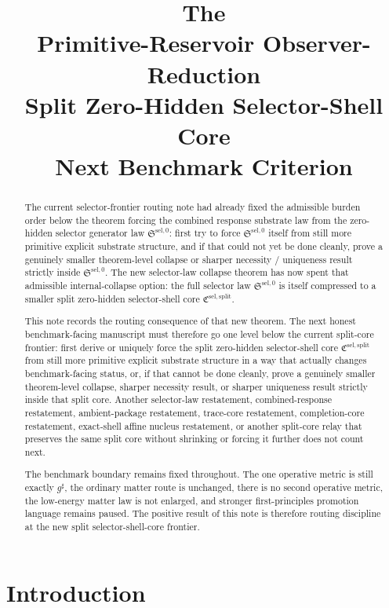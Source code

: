 \documentclass[11pt]{article}
\title{\textbf{The \TheoryName{}}\\[0.4em]
\large Primitive-Reservoir Observer-Reduction\\
\large Split Zero-Hidden Selector-Shell Core\\
\large Next Benchmark Criterion}
\author{}
\date{}
\newcommand{\CompletedMetric}{g^{\sharp}}
\newcommand{\SelectorLaw}{\mathfrak S^{\mathrm{sel},0}}
\newcommand{\SelectorCore}{\mathfrak C^{\mathrm{sel,split}}}
\begin{document}
\maketitle

\begin{abstract}
The current selector-frontier routing note had already fixed the admissible burden order below the theorem forcing the combined response substrate law from the zero-hidden selector generator law \(\SelectorLaw\): first try to force \(\SelectorLaw\) itself from still more primitive explicit substrate structure, and if that could not yet be done cleanly, prove a genuinely smaller theorem-level collapse or sharper necessity / uniqueness result strictly inside \(\SelectorLaw\). The new selector-law collapse theorem has now spent that admissible internal-collapse option: the full selector law \(\SelectorLaw\) is itself compressed to a smaller split zero-hidden selector-shell core \(\SelectorCore\).

This note records the routing consequence of that new theorem. The next honest benchmark-facing manuscript must therefore go one level below the current split-core frontier: first derive or uniquely force the split zero-hidden selector-shell core \(\SelectorCore\) from still more primitive explicit substrate structure in a way that actually changes benchmark-facing status, or, if that cannot be done cleanly, prove a genuinely smaller theorem-level collapse, sharper necessity result, or sharper uniqueness result strictly inside that split core. Another selector-law restatement, combined-response restatement, ambient-package restatement, trace-core restatement, completion-core restatement, exact-shell affine nucleus restatement, or another split-core relay that preserves the same split core without shrinking or forcing it further does not count next.

The benchmark boundary remains fixed throughout. The one operative metric is still exactly \(\CompletedMetric\), the ordinary matter route is unchanged, there is no second operative metric, the low-energy matter law is not enlarged, and stronger first-principles promotion language remains paused. The positive result of this note is therefore routing discipline at the new split selector-shell-core frontier.
\end{abstract}

\section{Introduction}
\end{document}
